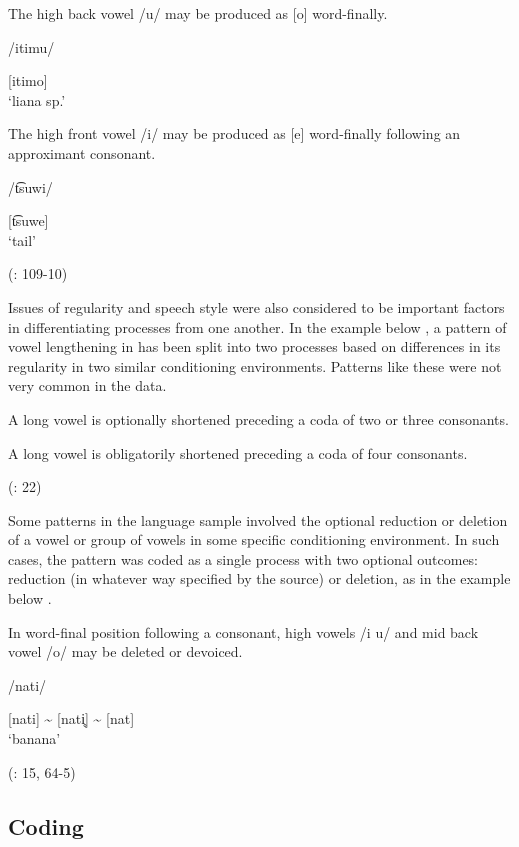 \ea\label{ex:6.11}

\ea  The high back vowel /u/ may be produced as [o] word-finally.

/itimu/

[itimo]\\
\glt ‘liana sp.’

\ex   The high front vowel /i/ may be produced as [e] word-finally following an approximant consonant.

/t͡suwi/

[t͡suwe]\\
\glt ‘tail’

(\citealt{VallejosYopán2010}: 109-10)
\z
\z

  Issues of regularity and speech style were also considered to be important factors in differentiating processes from one another. In the example below , a pattern of vowel lengthening in  has been split into two processes based on differences in its regularity in two similar conditioning environments. Patterns like these were not very common in the data.

\ea\label{ex:6.12}

\ea A long vowel is optionally shortened preceding a coda of two or three consonants.

\ex  A long vowel is obligatorily shortened preceding a coda of four consonants.

(\citealt{WieringWiering1994}: 22)
\z
\z

  Some patterns in the language sample involved the optional reduction or deletion of a vowel or group of vowels in some specific conditioning environment. In such cases, the pattern was coded as a single process with two optional outcomes: reduction (in whatever way specified by the source) or deletion, as in the  example below .

\ea\label{ex:6.13}

In word-final position following a consonant, high vowels /i u/ and mid back vowel /o/ may be deleted or devoiced.

/nati/

[nati] {\textasciitilde} [nati̥] {\textasciitilde} [nat]\\
\glt ‘banana’

(\citealt{Lacrampe2014}: 15, 64-5)
\z

\subsection{Coding}\label{sec:6.2.3}

